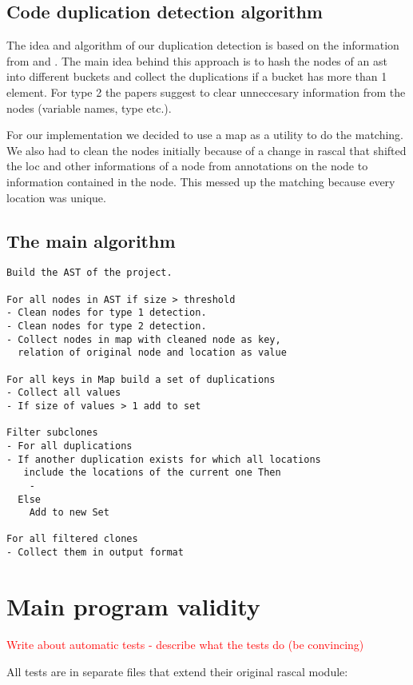 \documentclass{uva-inf-article}
\newcommand\todo[1]{\textcolor{red}{#1}}
\begin{document}
\subsection{Code duplication detection algorithm}

The idea and algorithm of our duplication detection is based on the
information from \cite{lazar2014clone} and \cite{baxter1998clone}. The main idea behind this approach
is to hash the nodes of an ast into different buckets and collect the
duplications if a bucket has more than 1 element. For type 2 the papers
suggest to clear unneccesary information from the nodes (variable names,
type etc.).

For our implementation we decided to use a map as a utility to do the
matching. We also had to clean the nodes initially because of a change
in rascal that shifted the loc and other informations of a node from
annotations on the node to information contained in the node. This
messed up the matching because every location was unique.

\subsection{The main algorithm}

\begin{verbatim}
Build the AST of the project.

For all nodes in AST if size > threshold
- Clean nodes for type 1 detection.
- Clean nodes for type 2 detection.
- Collect nodes in map with cleaned node as key, 
  relation of original node and location as value

For all keys in Map build a set of duplications
- Collect all values
- If size of values > 1 add to set

Filter subclones
- For all duplications
- If another duplication exists for which all locations
   include the locations of the current one Then
    -
  Else
    Add to new Set

For all filtered clones
- Collect them in output format
\end{verbatim}

\section{Main program validity}
\todo {Write about automatic tests - describe what the tests do (be convincing)}

All tests are in separate files that extend their original rascal module:
\end{document}
